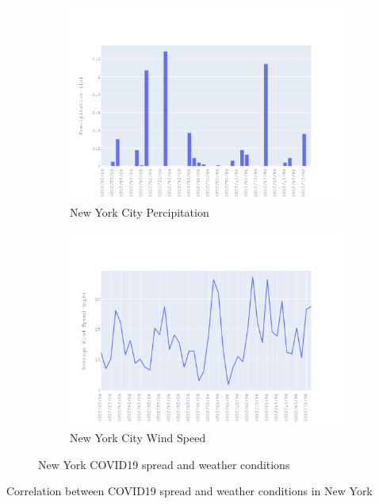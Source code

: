 \documentclass{homework}
\begin{document}
\begin{figure}[H]
  \begin{subfigure}{0.45\linewidth}
    \includegraphics[width=\linewidth]{task4/New York_rain.png}
    \caption{New York City Percipitation}
  \end{subfigure}
  \hfil
  \begin{subfigure}{0.45\linewidth}
    \includegraphics[width=\linewidth]{task4/New York_wnd.png}
    \caption{New York City Wind Speed}
  \end{subfigure}

  \caption{New York COVID19 spread and weather conditions}
  \label{fig:task4NY}
\end{figure}

\begin{table}[H]
  \caption{Correlation between COVID19 spread and weather conditions in New York}
  \label{Task 4 New York}
  \centering
  
\end{table}
\end{document}
